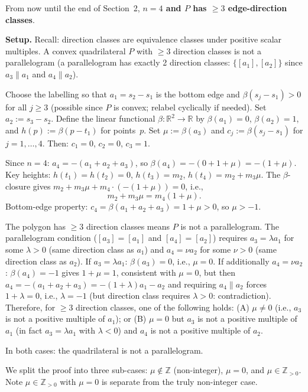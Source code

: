 \documentclass{article}
\begin{document}
From now until the end of Section~2, \textbf{$n=4$ and $P$ has $\ge 3$ edge-direction classes}.

\medskip
\noindent\textbf{Setup.}
Recall: direction classes are equivalence classes under positive scalar multiples.
A convex quadrilateral $P$ with $\ge 3$ direction classes is not a parallelogram
(a parallelogram has exactly 2 direction classes: $\{[a_1],[a_2]\}$ since $a_3\parallel a_1$ and $a_4\parallel a_2$).

Choose the labelling so that $a_1=s_2-s_1$ is the bottom edge and $\beta(s_j-s_1)>0$
for all $j\ge 3$ (possible since $P$ is convex; relabel cyclically if needed).
Set $a_2:=s_3-s_2$.
Define the linear functional $\beta:\mathbb{R}^2\to\mathbb{R}$ by $\beta(a_1)=0$, $\beta(a_2)=1$,
and $h(p):=\beta(p-t_1)$ for points~$p$.
Set $\mu:=\beta(a_3)$ and $c_j:=\beta(s_j-s_1)$ for $j=1,\dots,4$.
Then: $c_1=0$, $c_2=0$, $c_3=1$.

Since $n=4$: $a_4=-(a_1+a_2+a_3)$, so $\beta(a_4)=-(0+1+\mu)=-(1+\mu)$.
Key heights: $h(t_1)=h(t_2)=0$, $h(t_3)=m_2$, $h(t_4)=m_2+m_3\mu$.
The $\beta$-closure gives $m_2+m_3\mu+m_4\cdot(-(1+\mu))=0$, i.e.,
\begin{equation}\label{eq:closure4}
  m_2+m_3\mu = m_4(1+\mu).
\end{equation}
Bottom-edge property: $c_4=\beta(a_1+a_2+a_3)=1+\mu>0$, so $\mu>-1$.

The polygon has $\ge 3$ direction classes means $P$ is not a parallelogram.
The parallelogram condition ($[a_3]=[a_1]$ and $[a_4]=[a_2]$) requires
$a_3=\lambda a_1$ for some $\lambda>0$ (same direction class as $a_1$)
and $a_4=\nu a_2$ for some $\nu>0$ (same direction class as $a_2$).
If $a_3=\lambda a_1$: $\beta(a_3)=0$, i.e., $\mu=0$.
If additionally $a_4=\nu a_2$: $\beta(a_4)=-1$ gives $1+\mu=1$, consistent with $\mu=0$,
but then $a_4=-(a_1+a_2+a_3)=-(1+\lambda)a_1-a_2$ and requiring $a_4\parallel a_2$ forces
$1+\lambda=0$, i.e., $\lambda=-1$ (but direction class requires $\lambda>0$: contradiction).
Therefore, for $\ge 3$ direction classes, one of the following holds:
(A) $\mu\ne 0$ (i.e., $a_3$ is not a positive multiple of $a_1$); or
(B) $\mu=0$ but $a_3$ is not a positive multiple of $a_1$ (in fact $a_3=\lambda a_1$ with $\lambda<0$) and $a_4$ is not a positive multiple of $a_2$.

In both cases: the quadrilateral is not a parallelogram.

We split the proof into three sub-cases: $\mu\notin\mathbb{Z}$ (non-integer), $\mu=0$, and $\mu\in\mathbb{Z}_{>0}$.
Note $\mu\in\mathbb{Z}_{>0}$ with $\mu=0$ is separate from the truly non-integer case.
\end{document}
